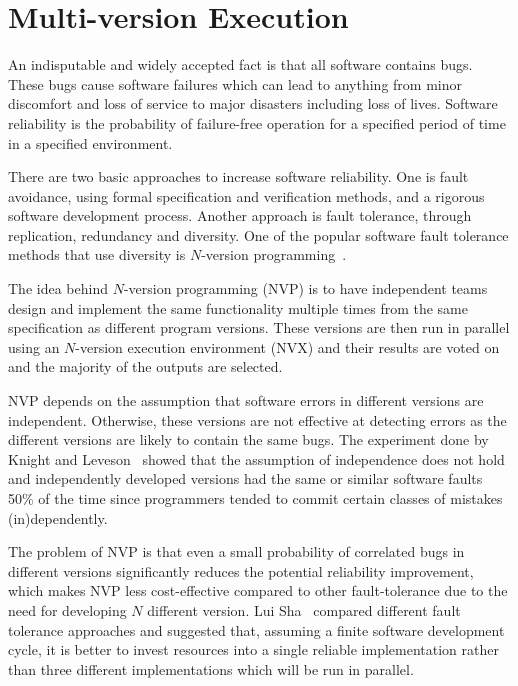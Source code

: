 \chapter{Multi-version Execution}
\label{chap:multi-version}

An indisputable and widely accepted fact is that all software contains bugs.
These bugs cause software failures which can lead to anything from minor
discomfort and loss of service to major disasters including loss of lives.
Software reliability is the probability of failure-free operation for a
specified period of time in a specified environment.

There are two basic approaches to increase software reliability. One is fault
avoidance, using formal specification and verification methods, and a rigorous
software development process. Another approach is fault tolerance, through
replication, redundancy and diversity. One of the popular software fault
tolerance methods that use diversity is $N$-version
programming~\cite{avizienis:nvp}.


The idea behind $N$-version programming (NVP) is to have independent teams
design and implement the same functionality multiple times from the same
specification as different program versions. These versions are then run in
parallel using an $N$-version execution environment (NVX) and their results are
voted on and the majority of the outputs are selected.

NVP depends on the assumption that software errors in different versions are
independent. Otherwise, these versions are not effective at detecting errors as
the different versions are likely to contain the same bugs. The experiment done
by Knight and Leveson~\cite{knight86,knight90} showed that the assumption of
independence does not hold and independently developed versions had the same or
similar software faults 50\% of the time since programmers tended to commit
certain classes of mistakes (in)dependently.

The problem of NVP is that even a small probability of correlated bugs in
different versions significantly reduces the potential reliability improvement,
which makes NVP less cost-effective compared to other fault-tolerance due to
the need for developing $N$ different version. Lui Sha~\cite{lui01} compared
different fault tolerance approaches and suggested that, assuming a finite
software development cycle, it is better to invest resources into a single
reliable implementation rather than three different implementations which will
be run in parallel.

